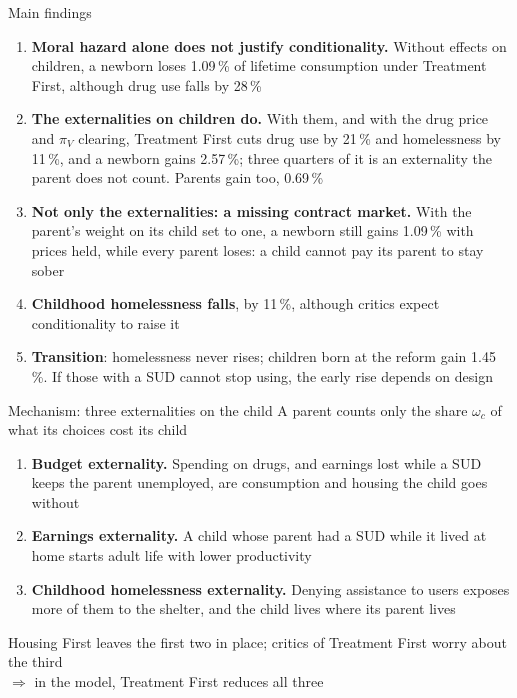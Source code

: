 \documentclass[aspectratio=169,11pt]{beamer}
\newcommand{\HF}{Housing First}
\newcommand{\TF}{Treatment First}
\newcommand{\pc}{\,\%}
\begin{document}
\begin{frame}{Main findings}
\small
\begin{enumerate}\setlength\itemsep{0.3em}
\item \textbf{Moral hazard alone does not justify conditionality.} Without effects on children, a newborn \alert{loses 1.09\pc} of lifetime consumption under \TF{}, although drug use falls by 28\pc
\item \textbf{The externalities on children do.} With them, and with the drug price and $\pi_V$ clearing, \TF{} cuts drug use by 21\pc{} and homelessness by 11\pc, and a newborn \alert{gains 2.57\pc}; three quarters of it is an externality the parent does not count. Parents gain too, 0.69\pc
\item \textbf{Not only the externalities: a missing contract market.} With the parent's weight on its child set to one, a newborn still gains 1.09\pc{} with prices held, while every parent loses: a child cannot pay its parent to stay sober
\item \textbf{Childhood homelessness falls}, by 11\pc, although critics expect conditionality to raise it
\item \textbf{Transition}: homelessness never rises; children born at the reform gain 1.45\pc. If those with a SUD cannot stop using, the early rise depends on design
\end{enumerate}
\end{frame}

\begin{frame}{Mechanism: three externalities on the child}
A parent counts only the share $\omega_c$ of what its choices cost its child
\vspace{0.3cm}
\begin{enumerate}\setlength\itemsep{0.6em}
\item \textbf{Budget externality.} Spending on drugs, and earnings lost while a SUD keeps the parent unemployed, are consumption and housing the child goes without
\item \textbf{Earnings externality.} A child whose parent had a SUD while it lived at home starts adult life with lower productivity
\item \textbf{Childhood homelessness externality.} Denying assistance to users exposes more of them to the shelter, and the child lives where its parent lives
\end{enumerate}
\vspace{0.3cm}
\HF{} leaves the first two in place; critics of \TF{} worry about the third\\[0.2em]
$\Rightarrow$ in the model, \TF{} reduces all three
\end{frame}
\end{document}
